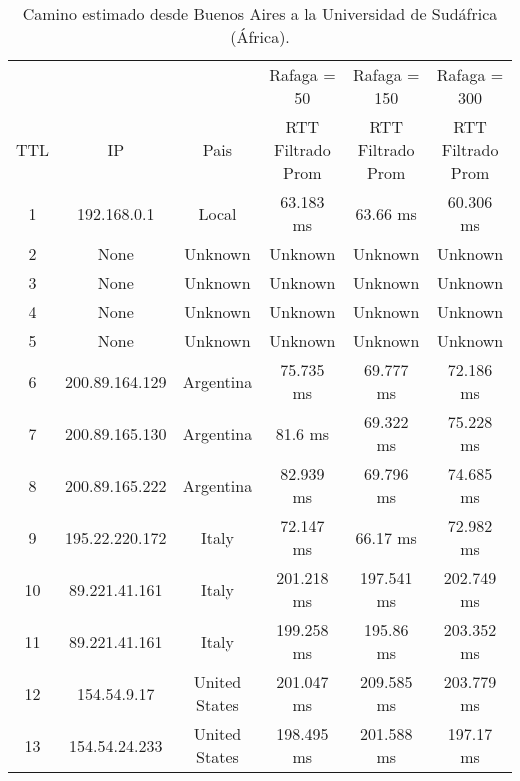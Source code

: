
\begin{table}[H]
\centering
\caption{Camino estimado desde Buenos Aires a la Universidad de Sudáfrica (África).}
\begin{tabular}{ | c | c | c | c | c | c | }
	\hline 
  & & & Rafaga = 50 & Rafaga = 150 &Rafaga = 300  \\ %
  TTL	&         IP        & 	        Pais      &  	 RTT Filtrado Prom  &	 RTT Filtrado Prom  & RTT Filtrado Prom  \\ \hline  
  1	&192.168.0.1        & 	       Local      &  	      63.183 ms     &	       63.66 ms     &      60.306 ms     \\ \hline  
  2	&None               & 	      Unknown     &  	      Unknown       &	      Unknown       &      Unknown       \\ \hline  
  3	&None               & 	      Unknown     &  	      Unknown       &	      Unknown       &      Unknown       \\ \hline  
  4	&None               & 	      Unknown     &  	      Unknown       &	      Unknown       &      Unknown       \\ \hline  
  5	&None               & 	      Unknown     &  	      Unknown       &	      Unknown       &      Unknown       \\ \hline  
  6	&200.89.164.129     & 	     Argentina    &  	      75.735 ms     &	      69.777 ms     &      72.186 ms     \\ \hline  
  7	&200.89.165.130     & 	     Argentina    &  	        81.6 ms     &	      69.322 ms     &      75.228 ms     \\ \hline  
  8	&200.89.165.222     & 	     Argentina    &  	      82.939 ms     &	      69.796 ms     &      74.685 ms     \\ \hline  
  9	&195.22.220.172     & 	       Italy      &  	      72.147 ms     &	       66.17 ms     &      72.982 ms     \\ \hline  
  10	&89.221.41.161      & 	       Italy      &  	     201.218 ms     &	     197.541 ms     &     202.749 ms     \\ \hline  
  11	&89.221.41.161      & 	       Italy      &  	     199.258 ms     &	      195.86 ms     &     203.352 ms     \\ \hline  
  12	&154.54.9.17        & 	   United States  &  	     201.047 ms     &	     209.585 ms     &     203.779 ms     \\ \hline  
  13	&154.54.24.233      & 	   United States  &  	     198.495 ms     &	     201.588 ms     &      197.17 ms     \\ \hline  

\end{tabular}
\end{table}
